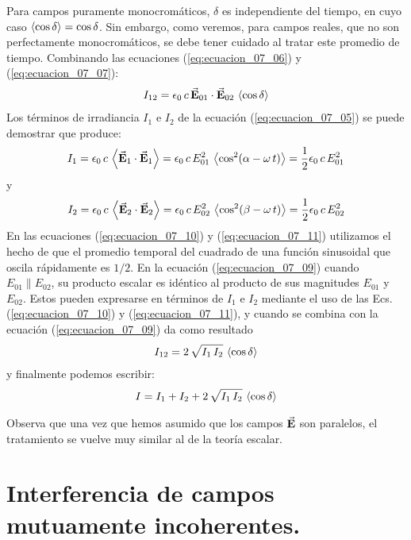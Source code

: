 \documentclass[14pt]{extarticle}
\begin{document}
Para campos puramente monocromáticos, $\delta$ es independiente del tiempo, en cuyo caso $\expval{\cos \delta} = \cos \delta$. Sin embargo, como veremos, para campos reales, que no son perfectamente monocromáticos, se debe tener cuidado al tratar este promedio de tiempo. Combinando las ecuaciones (\ref{eq:ecuacion_07_06}) y (\ref{eq:ecuacion_07_07}):
\begin{align}
I_{12} = \epsilon_{0} \, c \, \va{E}_{01} \cdot \va{E}_{02} \, \expval{\cos \delta}
\label{eq:ecuacion_07_09}
\end{align}
Los términos de irradiancia $I_{1}$ e $I_{2}$ de la ecuación (\ref{eq:ecuacion_07_05}) se puede demostrar que produce:
\begin{align}
I_{1} = \epsilon_{0} \, c \, \expval{\va{E}_{1} \cdot \va{E}_{1}} = \epsilon_{0} \, c \, E_{01}^{2} \, \expval{\cos^{2} (\alpha - \omega \, t)} = \dfrac{1}{2} \epsilon_{0} \, c \, E_{01}^{2}
\label{eq:ecuacion_07_10}
\end{align}
y
\begin{align}
I_{2} = \epsilon_{0} \, c \, \expval{\va{E}_{2} \cdot \va{E}_{2}} = \epsilon_{0} \, c \, E_{02}^{2} \, \expval{\cos^{2} (\beta - \omega \, t)} = \dfrac{1}{2} \epsilon_{0} \, c \, E_{02}^{2}
\label{eq:ecuacion_07_11}
\end{align}
En las ecuaciones (\ref{eq:ecuacion_07_10}) y (\ref{eq:ecuacion_07_11}) utilizamos el hecho de que el promedio temporal del cuadrado de una función sinusoidal que oscila rápidamente es $1/2$. En la ecuación (\ref{eq:ecuacion_07_09}) cuando $E_{01} \parallel E_{02}$, su producto escalar es idéntico al producto de sus magnitudes $E_{01}$ y $E_{02}$. Estos pueden expresarse en términos de $I_{1}$ e $I_{2}$ mediante el uso de las Ecs. (\ref{eq:ecuacion_07_10}) y (\ref{eq:ecuacion_07_11}), y cuando se combina con la ecuación (\ref{eq:ecuacion_07_09}) da como resultado
\begin{align}
I_{12} = 2 \, \sqrt{I_{1} \, I_{2}} \, \expval{\cos \delta}
\label{eq:ecuacion_07_12}
\end{align}
y finalmente podemos escribir:
\begin{align}
I = I_{1} + I_{2} + 2 \, \sqrt{I_{1} \, I_{2}} \, \expval{\cos \delta}
\label{eq:ecuacion_07_13}
\end{align}

Observa que una vez que hemos asumido que los campos $\va{E}$ son paralelos, el tratamiento se vuelve muy similar al de la teoría escalar.

\section{Interferencia de campos mutuamente incoherentes.}
\end{document}
